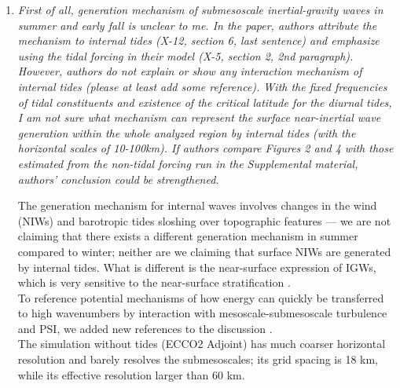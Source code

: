 \documentclass[11pt]{article}
\newcommand{\bdp}{\begin{description}}
\newcommand{\edp}{\end{description}}
\begin{document}
\begin{enumerate}

  \item {\it First of all, generation mechanism of submesoscale inertial-gravity waves in summer
        and early fall is unclear to me. In the paper, authors attribute the mechanism to
        internal tides (X-12, section 6, last sentence) and emphasize using the tidal forcing in
        their model (X-5, section 2, 2nd paragraph). However, authors do not explain or show
        any interaction mechanism of internal tides (please at least add some reference). With
        the fixed frequencies of tidal constituents and existence of the critical latitude for the
        diurnal tides, I am not sure what mechanism can represent the surface near-inertial
        wave generation within the whole analyzed region by internal tides (with the
        horizontal scales of 10-100km). If authors compare Figures 2 and 4 with those
        estimated from the non-tidal forcing run in the Supplemental material, authors'
        conclusion could be strengthened.}\\

        \bdp
          The generation mechanism for internal
          waves involves changes in the wind (NIWs) and barotropic tides sloshing over
          topographic features --- we are not claiming that there exists a different
          generation mechanism
          in summer compared to winter; neither are we claiming that surface NIWs
          are generated by internal tides. What is different is the near-surface
          expression of IGWs, which is very sensitive to the near-surface stratification
          \citep[; cf. second paragraph of discussion]{dasaro1978}.\\

          To reference potential mechanisms of how energy can quickly be transferred to
          high wavenumbers by interaction with mesoscale-submesoscale turbulence and
           PSI,  we added new references to the discussion \citep{mackinnon_winters2005,
           ponte_klein2015, alford_etal2016}. \\

          The simulation without tides (ECCO2 Adjoint) has much coarser
          horizontal resolution and barely resolves the submesoscales; its grid
          spacing is 18 km, while its effective resolution larger than 60 km.\\
      \edp



\end{enumerate}
\end{document}
